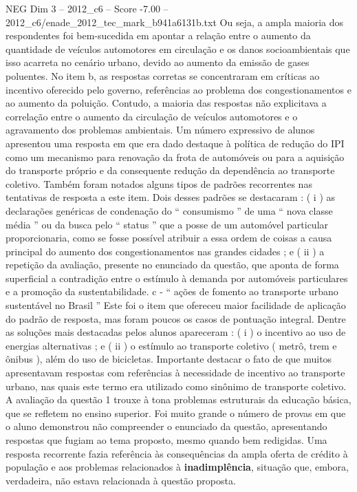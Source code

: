 \begin{textsample}{NEG Dim 3 – 2012\_c6 – Score -7.00 – 2012\_c6/enade\_2012\_tec\_mark\_b941a6131b.txt}
Ou seja, a ampla maioria dos respondentes foi bem-sucedida em apontar a relação entre o aumento da quantidade de veículos automotores em circulação e os danos socioambientais que isso acarreta no cenário urbano, devido ao aumento da emissão de gases poluentes.
No item b, as respostas corretas se concentraram em críticas ao incentivo oferecido pelo governo, referências ao problema dos congestionamentos e ao aumento da poluição.
Contudo, a maioria das respostas não explicitava a correlação entre o aumento da circulação de veículos automotores e o agravamento dos problemas ambientais.
Um número expressivo de alunos apresentou uma resposta em que era dado destaque à política de redução do IPI como um mecanismo para renovação da frota de automóveis ou para a aquisição do transporte próprio e da consequente redução da dependência ao transporte coletivo.
Também foram notados alguns tipos de padrões recorrentes nas tentativas de resposta a este item.
Dois desses padrões se destacaram : ( i ) as declarações genéricas de condenação do “ consumismo ” de uma “ nova classe média ” ou da busca pelo “ status ” que a posse de um automóvel particular proporcionaria, como se fosse possível atribuir a essa ordem de coisas a causa principal do aumento dos congestionamentos nas grandes cidades ; e ( ii ) a repetição da avaliação, presente no enunciado da questão, que aponta de forma superficial a contradição entre o estímulo à demanda por automóveis particulares e a promoção da sustentabilidade. c - “ ações de fomento ao transporte urbano sustentável no Brasil ” Este foi o item que ofereceu maior facilidade de aplicação do padrão de resposta, mas foram poucos os casos de pontuação integral.
Dentre as soluções mais destacadas pelos alunos apareceram : ( i ) o incentivo ao uso de energias alternativas ; e ( ii ) o estímulo ao transporte coletivo ( metrô, trem e ônibus ), além do uso de bicicletas.
Importante destacar o fato de que muitos apresentavam respostas com referências à necessidade de incentivo ao transporte urbano, nas quais este termo era utilizado como sinônimo de transporte coletivo.
A avaliação da questão 1 trouxe à tona problemas estruturais da educação básica, que se refletem no ensino superior.
Foi muito grande o número de provas em que o aluno demonstrou não compreender o enunciado da questão, apresentando respostas que fugiam ao tema proposto, mesmo quando bem redigidas.
Uma resposta recorrente fazia referência às consequências da ampla oferta de crédito à população e aos problemas relacionados à \textbf{inadimplência}, situação que, embora, verdadeira, não estava relacionada à questão proposta.

\end{textsample}
